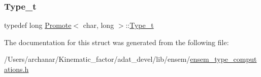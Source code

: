 \subsubsection{\texorpdfstring{Type\_t}{Type\_t}\hspace{0.1cm}{\footnotesize\ttfamily [2/2]}}
{\footnotesize\ttfamily typedef long \mbox{\hyperlink{structPromote}{Promote}}$<$ char, long $>$\+::\mbox{\hyperlink{structPromote_3_01char_00_01long_01_4_a1f06e3372fb9659a4cba391658ec5883}{Type\+\_\+t}}}



The documentation for this struct was generated from the following file\+:\begin{DoxyCompactItemize}
\item 
/\+Users/archanar/\+Kinematic\+\_\+factor/adat\+\_\+devel/lib/ensem/\mbox{\hyperlink{lib_2ensem_2ensem__type__computations_8h}{ensem\+\_\+type\+\_\+computations.\+h}}\end{DoxyCompactItemize}
